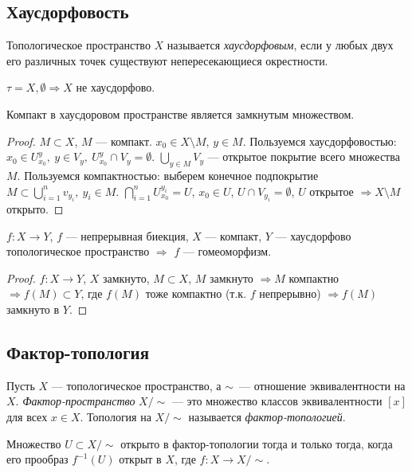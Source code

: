 \subsection{Хаусдорфовость}
\begin{definition}
    Топологическое пространство $X$ называется \textit{хаусдорфовым}, если у любых двух его различных точек существуют непересекающиеся окрестности.
\end{definition}

$\tau = {X, \emptyset} \Rightarrow X$ не хаусдорфово.

\begin{lemma}
    Компакт в хаусдоровом пространстве является замкнутым множеством.
\end{lemma}
\begin{proof}
    $M \subset X$, $M$ — компакт.
    $x_0 \in X \setminus M$, $y \in M$.
    Пользуемся хаусдорфовостью: $x_0 \in U_{x_0}^y, \ y \in V_y, \ U_{x_0}^y \cap V_y = \emptyset$.
    $\bigcup_{y \in M} V_y$ — открытое покрытие всего множества $M$.
    Пользуемся компактностью: выберем конечное подпокрытие $M \subset \bigcup_{i = 1}^n v_{y_i}, \ y_i \in M$.
    $\bigcap_{i = 1}^n U_{x_0}^{y_i} = U$, $x_0 \in U$, $U \cap V_{y_i} = \emptyset$, $U$ открытое $\Rightarrow X \setminus M$ открыто.
\end{proof}

\begin{statement}
    $f: X \to Y$, $f$ — непрерывная биекция, $X$ — компакт, $Y$ — хаусдорфово топологическое пространство $\Longrightarrow$ $f$ — гомеоморфизм.
\end{statement}
\begin{proof}
    $f: X \to Y$, $X$ замкнуто, $M \subset X$, $M$ замкнуто $\Rightarrow M$ компактно $\Rightarrow f(M) \subset Y$, где $f(M)$ тоже компактно (т.к. $f$ непрерывно) $\Rightarrow f(M)$ замкнуто в $Y$. 
\end{proof}


\subsection{Фактор-топология}


\begin{definition}
    Пусть $X$ — топологическое пространство, а $\sim$ — отношение эквивалентности на $X$. \textit{Фактор-пространство} $X / \sim$ — это множество классов эквивалентности $[x]$ для всех $x \in X$. Топология на $X / \sim$ называется \textit{фактор-топологией}.

    Множество $U \subset X / \sim $ открыто в фактор-топологии тогда и только тогда, когда его прообраз $f^{-1}(U)$ открыт в $X$, где $f: X \to X / \sim$.
\end{definition}

